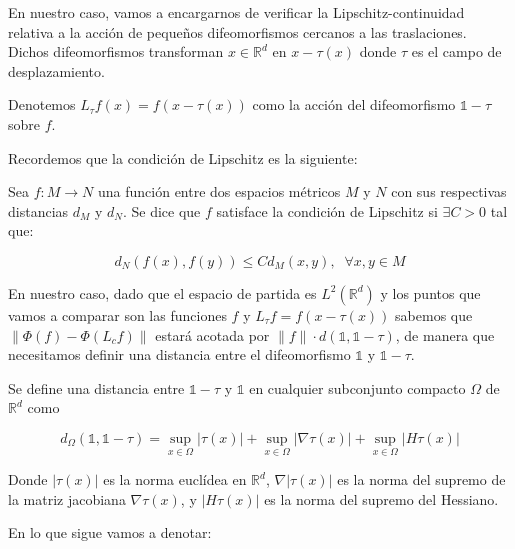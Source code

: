 \noindent En nuestro caso, vamos a encargarnos de verificar la Lipschitz-continuidad relativa a la acción de pequeños difeomorfismos cercanos a las traslaciones. Dichos difeomorfismos transforman $x \in \mathbb{R}^d$ en $x-\tau (x)$ donde $\tau$ es el campo de desplazamiento. 

\begin{definicion}
Denotemos $L_{\tau} f(x)=f(x-\tau(x))$ como la acción del difeomorfismo $\mathbb{1}-\tau$ sobre $f$.
\end{definicion} 

\medskip

\noindent Recordemos que la condición de Lipschitz es la siguiente: 

\begin{definicion}
  Sea $f: M \rightarrow N$ una función entre dos espacios métricos $M$ y $N$ con sus respectivas distancias $d_M$ y $d_N$. Se dice que $f$ satisface la condición de Lipschitz si $\exists C>0$ tal que: 

  $$d_N(f(x),f(y))\leq C d_M(x,y), \; \; \forall x,y \in M$$
\end{definicion}

\noindent En nuestro caso, dado que el espacio de partida es $L^2(\mathbb{R}^d)$ y los puntos que vamos a comparar son las funciones $f$ y $L_\tau f=f(x-\tau(x))$ sabemos que $\|\Phi(f) - \Phi(L_cf) \|$ estará acotada por $\|f\| · d(\mathbb{1}, \mathbb{1}-\tau)$, de manera que necesitamos definir una distancia entre el difeomorfismo $\mathbb{1}$ y $\mathbb{1}-\tau$. 

\begin{definicion}
Se define una distancia entre $\mathbb{1}-\tau$ y $\mathbb{1}$ en cualquier subconjunto compacto $\Omega$ de $\mathbb{R}^d$ como 

\begin{equation} \label{eq::distancia}
  d_\Omega(\mathbb{1},\mathbb{1}-\tau) = \sup_{x \in \Omega} |\tau (x)| + \sup_{x \in \Omega} |\nabla \tau (x)| + \sup_{x \in \Omega}|H \tau (x)|
\end{equation}

\end{definicion}
\medskip

\noindent Donde $|\tau (x)|$ es la norma euclídea en $\mathbb{R}^d$, $\nabla |\tau (x)|$ es la norma del supremo de la matriz jacobiana $\nabla \tau (x)$, y $|H \tau (x)|$ es la norma del supremo del Hessiano.

\medskip


\noindent En lo que sigue vamos a denotar: 

